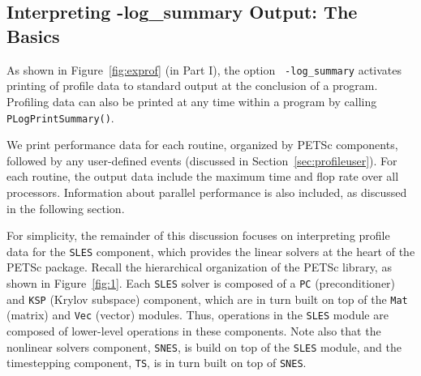 \subsection{Interpreting -log\_summary Output: The Basics}

As shown in Figure~\ref{fig:exprof} (in Part I), the option {\tt
-log\_summary}  activates printing of profile
data to standard output at the conclusion of a program.  Profiling
data can also be printed at any time within a program by calling {\tt
PLogPrintSummary()}.

We print performance data for each routine, organized by PETSc
components, followed by any user-defined events (discussed in
Section~\ref{sec:profileuser}).  For each routine, the output data
include the maximum time and flop rate over all processors.
Information about parallel performance is also included, as
discussed in the following section.

For simplicity, the remainder of this discussion focuses on
interpreting profile data for the {\tt SLES} component, 
which provides the linear solvers at the heart of the
PETSc package.  Recall the hierarchical organization of the PETSc
library, as shown in Figure~\ref{fig:1}.  Each {\tt SLES} solver 
is composed of a {\tt PC} (preconditioner) and {\tt KSP} (Krylov
subspace) component, which are in turn built on top of the {\tt Mat} 
(matrix) and {\tt Vec} (vector) modules.  Thus, operations in the
{\tt SLES} module are composed of lower-level operations in these
components.  Note also that the nonlinear solvers component, {\tt SNES}, 
is build on top of the {\tt SLES} module, and the timestepping
component, {\tt TS}, is in turn built on top of {\tt SNES}.

